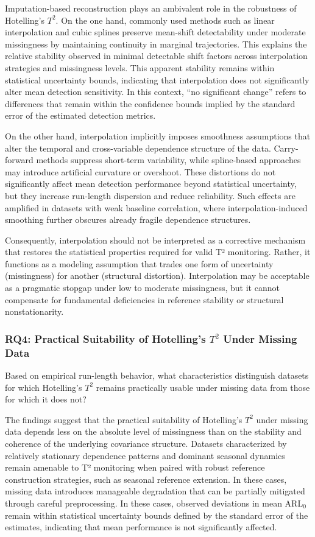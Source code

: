 Imputation-based reconstruction plays an ambivalent role in the robustness of Hotelling’s $T^2$. On the one hand, commonly used methods such as linear interpolation and cubic splines preserve mean-shift detectability under moderate missingness by maintaining continuity in marginal trajectories. This explains the relative stability observed in minimal detectable shift factors across interpolation strategies and missingness levels. This apparent stability remains within statistical uncertainty bounds, indicating that interpolation does not significantly alter mean detection sensitivity. In this context, “no significant change” refers to differences that remain within the confidence bounds implied by the standard error of the estimated detection metrics.

On the other hand, interpolation implicitly imposes smoothness assumptions that alter the temporal and cross-variable dependence structure of the data. Carry-forward methods suppress short-term variability, while spline-based approaches may introduce artificial curvature or overshoot. These distortions do not significantly affect mean detection performance beyond statistical uncertainty, but they increase run-length dispersion and reduce reliability. Such effects are amplified in datasets with weak baseline correlation, where interpolation-induced smoothing further obscures already fragile dependence structures.

Consequently, interpolation should not be interpreted as a corrective mechanism that restores the statistical properties required for valid T² monitoring. Rather, it functions as a modeling assumption that trades one form of uncertainty (missingness) for another (structural distortion). Interpolation may be acceptable as a pragmatic stopgap under low to moderate missingness, but it cannot compensate for fundamental deficiencies in reference stability or structural nonstationarity.

\subsubsection{RQ4: Practical Suitability of Hotelling’s $T^2$ Under Missing Data}

Based on empirical run-length behavior, what characteristics distinguish datasets for which Hotelling’s $T^2$ remains practically usable under missing data from those for which it does not?

The findings suggest that the practical suitability of Hotelling’s $T^2$ under missing data depends less on the absolute level of missingness than on the stability and coherence of the underlying covariance structure.  Datasets characterized by relatively stationary dependence patterns and dominant seasonal dynamics remain amenable to T² monitoring when paired with robust reference construction strategies, such as seasonal reference extension. In these cases, missing data introduces manageable degradation that can be partially mitigated through careful preprocessing. In these cases, observed deviations in mean \ac{ARL}$_0$ remain within statistical uncertainty bounds defined by the standard error of the estimates, indicating that mean performance is not significantly affected.


